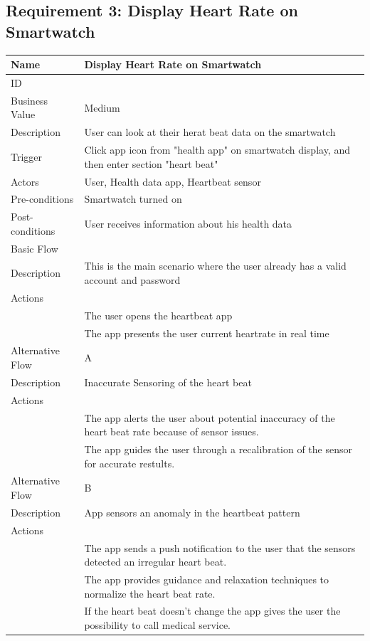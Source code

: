 \documentclass{article}
\begin{document}
	\subsection{Requirement 3: Display Heart Rate on Smartwatch}
		\begin{center}
			\begin{tabularx}{1.0\textwidth}{|>{\raggedright\arraybackslash}p{}|>{\raggedright\arraybackslash}X|}
				\hline
				Name             & Display Heart Rate on Smartwatch \\ \hline
				ID               & 3 \\ \hline
				Business Value   & Medium \\ \hline
				Description      & User can look at their herat beat data on the smartwatch \\ \hline
				Trigger          & Click app icon from "health app" on smartwatch display, and then enter section "heart beat" \\ \hline
				Actors           & User, Health data app, Heartbeat sensor \\ \hline
				Pre-conditions   & Smartwatch turned on \\ \hline
				Post-conditions  & User receives information about his health data \\ \hline
				Basic Flow       & \\ \hline
								Description & This is the main scenario where the user already has a valid account and password \\ \hline
								Actions & \\ \hline
								1 & The user opens the heartbeat app \\ \hline
								2 & The app presents the user current heartrate in real time \\ \hline
				Alternative Flow & A \\ \hline
								Description & Inaccurate Sensoring of the heart beat \\ \hline
								Actions & \\ \hline
								1 & The app alerts the user about potential inaccuracy of the heart beat rate because of sensor issues. \\ \hline
								2 & The app guides the user through a recalibration of the sensor for accurate restults.  \\ \hline
				Alternative Flow & B \\ \hline
								Description & App sensors an anomaly in the heartbeat pattern  \\ \hline
								Actions & \\ \hline
								1 & The app sends a push notification to the user that the sensors detected an irregular heart beat. \\ \hline
								2 & The app provides guidance and relaxation techniques to normalize the heart beat rate. \\ \hline
								3 & If the heart beat doesn't change the app gives the user the possibility to call medical service. \\ \hline
			\end{tabularx}
		\end{center}
	\newpage
\end{document}

